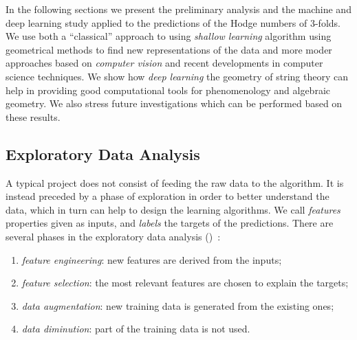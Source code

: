 In the following sections we present the preliminary analysis and the machine and deep learning study applied to the predictions of the Hodge numbers of \cicy $3$-folds.
We use both a ``classical'' approach to \ml using \emph{shallow learning} algorithm using geometrical methods to find new representations of the data and more moder approaches based on \emph{computer vision} and recent developments in computer science techniques.
We show how \emph{deep learning} the geometry of string theory can help in providing good computational tools for phenomenology and algebraic geometry.
We also stress future investigations which can be performed based on these results.


\subsection{Exploratory Data Analysis}
\label{sec:data:eda}

A typical \ml project does not consist of feeding the raw data to the algorithm.
It is instead preceded by a phase of exploration in order to better understand the data, which in turn can help to design the learning algorithms.
We call \emph{features} properties given as inputs, and \emph{labels} the targets of the predictions.
There are several phases in the exploratory data analysis (\eda)~\cite{Skiena:2017:DataScienceDesign}:
\begin{enumerate}
  \item \emph{feature engineering}: new features are derived from the inputs;

  \item \emph{feature selection}: the most relevant features are chosen to explain the targets;

  \item \emph{data augmentation}: new training data is generated from the existing ones;

  \item \emph{data diminution}: part of the training data is not used.
\end{enumerate}

